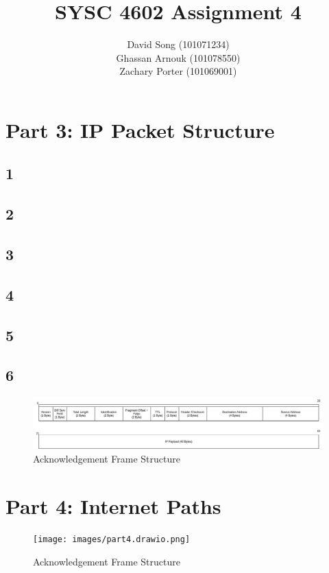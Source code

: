 \documentclass{article}
\begin{document}
    \title  { \textbf{SYSC 4602 Assignment 4} }
    \author {
        David Song (101071234)\\
        Ghassan Arnouk (101078550)\\
        Zachary Porter (101069001)
    }

    \maketitle

    \clearpage
    \section*{Part 3: IP Packet Structure}
    \subsection*{1}
    \subsection*{2}
    \subsection*{3}
    \subsection*{4}
    \subsection*{5}
    \subsection*{6}
    \begin{figure}[htbp]
        \centering
        \includegraphics[width=\textwidth]{images/part3.drawio.png}
        \caption{Acknowledgement Frame Structure}
    \end{figure}
    \section*{Part 4: Internet Paths}
    \begin{figure}[htbp]
        \centering
        \texttt{[image: images/part4.drawio.png]}
        \caption{Acknowledgement Frame Structure}
    \end{figure}
\end{document}
